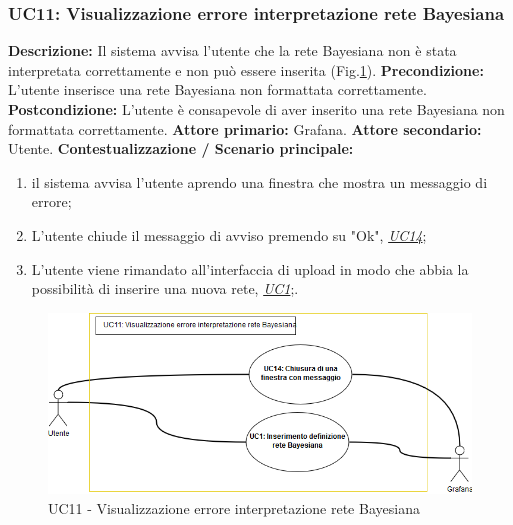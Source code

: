                 \subsubsection{UC11: Visualizzazione errore interpretazione rete Bayesiana}
                    \textbf{Descrizione:} Il sistema avvisa l’utente che la rete Bayesiana non è stata interpretata correttamente e non può essere inserita (Fig.\ref{uc11}).
                    \newline
                    \textbf{Precondizione:} L’utente inserisce una rete Bayesiana non formattata correttamente.
                    \newline
                    \textbf{Postcondizione:} L’utente è consapevole di aver inserito una rete Bayesiana non formattata correttamente.
                    \newline
                    \textbf{Attore primario:} Grafana.
                    \newline
                    \textbf{Attore secondario:} Utente.
                    \newline
                    \textbf{Contestualizzazione / Scenario principale:} \begin{enumerate}
                            \item il sistema avvisa l'utente aprendo una finestra che mostra un messaggio di errore;
                            \item L'utente chiude il messaggio di avviso premendo su "Ok", \underline{\textit{UC14}};
                            \item L'utente viene rimandato all'interfaccia di upload in modo che abbia la possibilità di inserire una nuova rete, \underline{\textit{UC1}};.
                        \end{enumerate}
                
                \begin{figure}[!htbp]
                    	\centering
                    	\includegraphics[width=\textwidth]{UC11.png}
                    	\caption{UC11 - Visualizzazione errore interpretazione rete Bayesiana}
                    	\label{uc11}
                    \end{figure}
                
